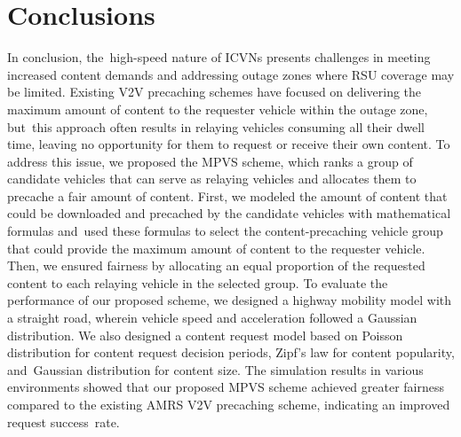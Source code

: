 \documentclass[sensors,aricle,accept,pdftex,moreauthors]{Definitions/mdpi}
\begin{document}
{\section{Conclusions} \label{sec6}
In conclusion, the~high-speed nature of {ICVNs} presents challenges in meeting increased content demands and addressing outage zones where RSU coverage may be limited. Existing V2V precaching schemes have focused on delivering the maximum amount of content to the requester vehicle within the outage zone, but~this approach often results in relaying vehicles consuming all their dwell time, leaving no opportunity for them to request or receive their own content.
To address this issue, we proposed the MPVS scheme, which ranks a group of candidate vehicles that can serve as relaying vehicles and allocates them to precache a fair amount of content. First, we modeled the amount of content that could be downloaded and precached by the candidate vehicles with mathematical formulas and~used these formulas to select the content-precaching vehicle group that could provide the maximum amount of content to the requester vehicle. Then, we ensured fairness by allocating an equal proportion of the requested content to each relaying vehicle in the selected group.
To evaluate the performance of our proposed scheme, we designed a highway mobility model with a straight road, wherein vehicle speed and acceleration followed a Gaussian distribution. We also designed a content request model based on Poisson distribution for content request decision periods, Zipf's law for content popularity, and~Gaussian distribution for content size. The simulation results in various environments showed that our proposed MPVS scheme achieved greater fairness compared to the existing AMRS V2V precaching scheme, indicating an improved request success~rate.

}
\end{document}
